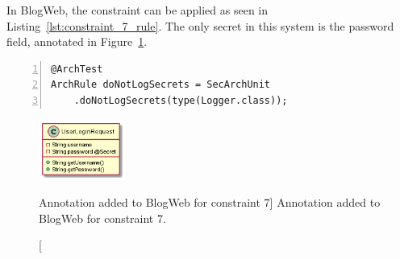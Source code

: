 In BlogWeb, the constraint can be applied as seen in Listing~\ref{lst:constraint_7_rule}. The only secret in this system is the password field, annotated in Figure~\ref{fig:secrets_toy_system}.

\begin{minipage}{\linewidth}
\begin{lstlisting}[caption={Application of constraint 7 to BlogWeb.}, captionpos=b, label=lst:constraint_7_rule, numbers=left]
@ArchTest
ArchRule doNotLogSecrets = SecArchUnit
    .doNotLogSecrets(type(Logger.class));
\end{lstlisting}
\end{minipage}

\begin{figure}[H]
    \centering
    \includegraphics[width=0.25\textwidth]{figure/toyexamples/Secrets.png}
    \caption
        [Annotation added to BlogWeb for constraint 7]
        {Annotation added to BlogWeb for constraint 7.}
    \label{fig:secrets_toy_system}
\end{figure}